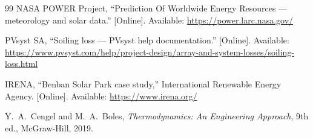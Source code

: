 \documentclass[11pt,a4paper]{article}
\begin{document}
\begin{thebibliography}{99}
NASA POWER Project, ``Prediction Of Worldwide Energy Resources --- meteorology and solar data.'' [Online]. Available: \url{https://power.larc.nasa.gov/}

PVsyst SA, ``Soiling loss --- PVsyst help documentation.'' [Online]. Available: \url{https://www.pvsyst.com/help/project-design/array-and-system-losses/soiling-loss.html}

IRENA, ``Benban Solar Park case study,'' International Renewable Energy Agency. [Online]. Available: \url{https://www.irena.org/}

Y.~A.~Cengel and M.~A.~Boles, \emph{Thermodynamics: An Engineering Approach}, 9th ed., McGraw-Hill, 2019.
\end{thebibliography}
\end{document}
